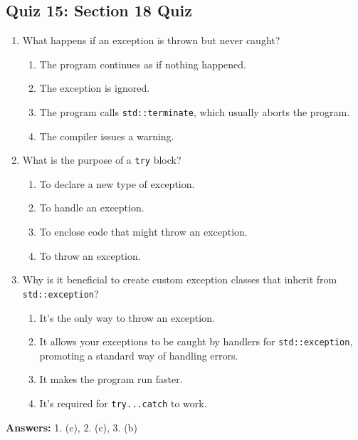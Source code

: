 \subsection{Quiz 15: Section 18 Quiz}
\begin{enumerate}
    \item What happens if an exception is thrown but never caught?
    \begin{enumerate}
        \item[a)] The program continues as if nothing happened.
        \item[b)] The exception is ignored.
        \item[c)] The program calls \texttt{std::terminate}, which usually aborts the program.
        \item[d)] The compiler issues a warning.
    \end{enumerate}

    \item What is the purpose of a \texttt{try} block?
    \begin{enumerate}
        \item[a)] To declare a new type of exception.
        \item[b)] To handle an exception.
        \item[c)] To enclose code that might throw an exception.
        \item[d)] To throw an exception.
    \end{enumerate}

    \item Why is it beneficial to create custom exception classes that inherit from \texttt{std::exception}?
    \begin{enumerate}
        \item[a)] It's the only way to throw an exception.
        \item[b)] It allows your exceptions to be caught by handlers for \texttt{std::exception}, promoting a standard way of handling errors.
        \item[c)] It makes the program run faster.
        \item[d)] It's required for \texttt{try...catch} to work.
    \end{enumerate}
\end{enumerate}

\textbf{Answers:} 1. (c), 2. (c), 3. (b)
